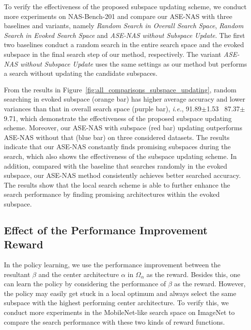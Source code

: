 \documentclass[lettersize,journal]{IEEEtran}
\newcommand{\sexyname}{ASE-NAS\xspace}
\def\ie{\emph{i.e.}} \def\Ie{\emph{I.e.}}
\begin{document}
To verify the effectiveness of the proposed subspace updating scheme, we conduct more experiments on NAS-Bench-201 and compare our \sexyname with three baselines and variants, namely \textit{Random Search in Overall Search Space}, \textit{Random Search in Evoked Search Space} and \textit{\sexyname without Subspace Update}.
The first two baselines conduct a random search in the entire search space and the evoked subspace in the final search step of our method, respectively.
The variant \textit{\sexyname without Subspace Update} uses the same settings as our method but performs a search without updating the candidate subspaces.

From the results in Figure~\ref{fig:all_comparisons_subspace_updating}, random searching in evoked subspace (orange bar) has higher average accuracy and lower variances than that in overall search space (purple bar), \ie, 91.89$\pm$1.53 \vs~87.37$\pm$9.71, which demonstrate the effectiveness of the proposed subspace updating scheme.
Moreover, our \sexyname with subspace (red bar) updating outperforms \sexyname without that (blue bar) on three considered datasets. The results indicate that our \sexyname constantly finds promising subspaces during the search, which also shows the effectiveness of the subspace updating scheme.
In addition, compared with the baseline that searches randomly in the evoked subspace, our \sexyname method consistently achieves better searched accuracy. The results show that the local search scheme is able to further enhance the search performance by finding promising architectures within the evoked subspace.


\subsection{Effect of the Performance Improvement Reward}\label{sec:ablation_perf_imp_reward}

In the policy learning, we use the performance improvement between the resultant $\beta$ and the center architecture $\alpha$ in $\Omega_{\alpha}$ as the reward.
Besides this, one can learn the policy by considering the performance of $\beta$ as the reward.
However, the policy may easily get stuck in a local optimum and always select the same subspace with the highest performing center architecture.
To verify this, we conduct more experiments in the MobileNet-like search space on ImageNet to compare the search performance with these two kinds of reward functions.
\end{document}
